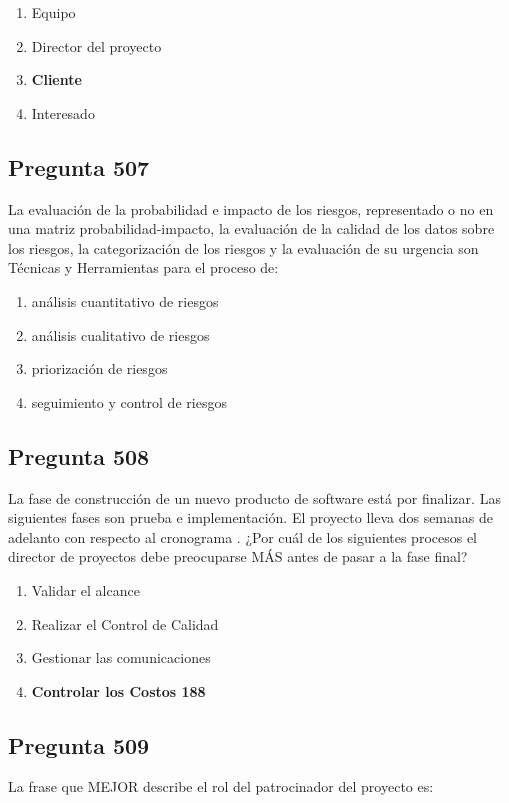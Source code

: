\documentclass[11pt,a4paper]{article}
\begin{document}
\begin{enumerate}[label=\alph*)]
  \item Equipo
  \item Director del proyecto
  \item \textbf{Cliente}
  \item Interesado
\end{enumerate}

\subsection*{Pregunta 507}
La evaluación de la probabilidad e impacto de los riesgos, representado o no en una matriz probabilidad-impacto, la evaluación de la calidad de los datos sobre los riesgos, la categorización de los riesgos y la evaluación de su urgencia son Técnicas y Herramientas para el proceso de:

\begin{enumerate}[label=\alph*)]
  \item análisis cuantitativo de riesgos
  \item análisis cualitativo de riesgos
  \item priorización de riesgos
  \item seguimiento y control de riesgos
\end{enumerate}

\subsection*{Pregunta 508}
La fase de construcción de un nuevo producto de software está por finalizar. Las siguientes fases son prueba e implementación. El proyecto lleva dos semanas de adelanto con respecto al cronograma . ¿Por cuál de los siguientes procesos el director de proyectos debe preocuparse MÁS antes de pasar a la fase final?

\begin{enumerate}[label=\alph*)]
  \item Validar el alcance
  \item Realizar el Control de Calidad
  \item Gestionar las comunicaciones
  \item \textbf{Controlar los Costos 188}
\end{enumerate}

\subsection*{Pregunta 509}
La frase que MEJOR describe el rol del patrocinador del proyecto es:
\end{document}
